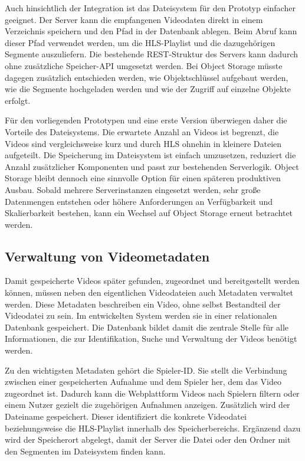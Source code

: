 Auch hinsichtlich der Integration ist das Dateisystem für den Prototyp einfacher geeignet. Der Server kann die empfangenen Videodaten direkt in einem Verzeichnis speichern und den Pfad in der Datenbank ablegen. Beim Abruf kann dieser Pfad verwendet werden, 
um die HLS-Playlist und die dazugehörigen Segmente auszuliefern. Die bestehende REST-Struktur des Servers kann dadurch ohne zusätzliche Speicher-API umgesetzt werden. Bei Object Storage müsste dagegen zusätzlich entschieden werden, wie Objektschlüssel aufgebaut werden, 
wie die Segmente hochgeladen werden und wie der Zugriff auf einzelne Objekte erfolgt. 

Für den vorliegenden Prototypen und eine erste Version überwiegen daher die Vorteile des Dateisystems. Die erwartete Anzahl an Videos ist begrenzt, die Videos sind vergleichsweise kurz und durch HLS ohnehin in kleinere Dateien aufgeteilt. Die Speicherung im Dateisystem ist einfach umzusetzen, 
reduziert die Anzahl zusätzlicher Komponenten und passt zur bestehenden Serverlogik. Object Storage bleibt dennoch eine sinnvolle Option für einen späteren produktiven Ausbau. Sobald mehrere Serverinstanzen eingesetzt werden, 
sehr große Datenmengen entstehen oder höhere Anforderungen an Verfügbarkeit und Skalierbarkeit bestehen, kann ein Wechsel auf Object Storage erneut betrachtet werden.

\subsection{Verwaltung von Videometadaten} 

Damit gespeicherte Videos später gefunden, zugeordnet und bereitgestellt werden können, müssen neben den eigentlichen Videodateien auch Metadaten verwaltet werden. Diese Metadaten beschreiben ein Video, ohne selbst Bestandteil der Videodatei zu sein. 
Im entwickelten System werden sie in einer relationalen Datenbank gespeichert. Die Datenbank bildet damit die zentrale Stelle für alle Informationen, die zur Identifikation, Suche und Verwaltung der Videos benötigt werden. 

Zu den wichtigsten Metadaten gehört die Spieler-ID. Sie stellt die Verbindung zwischen einer gespeicherten Aufnahme und dem Spieler her, dem das Video zugeordnet ist. Dadurch kann die Webplattform Videos nach Spielern filtern oder einem Nutzer gezielt die zugehörigen Aufnahmen anzeigen. 
Zusätzlich wird der Dateiname gespeichert. Dieser identifiziert die konkrete Videodatei beziehungsweise die HLS-Playlist innerhalb des Speicherbereichs. Ergänzend dazu wird der Speicherort abgelegt, damit der Server die Datei oder den Ordner mit den Segmenten im Dateisystem finden kann. 

